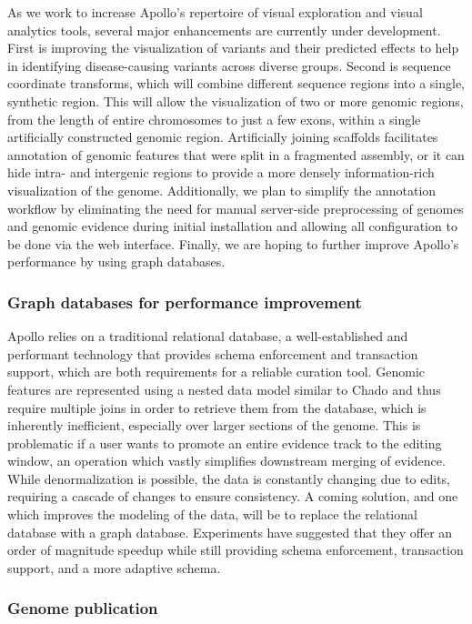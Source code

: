 As we work to increase Apollo's repertoire of visual exploration and
visual analytics tools, several major enhancements are currently under
development. First is improving the visualization of variants and their
predicted effects to help in identifying disease-causing variants across
diverse groups. Second is sequence coordinate transforms, which will
combine different sequence regions into a single, synthetic region. This
will allow the visualization of two or more genomic regions, from the
length of entire chromosomes to just a few exons, within a single
artificially constructed genomic region. Artificially joining scaffolds
facilitates annotation of genomic features that were split in a
fragmented assembly, or it can hide intra- and intergenic regions to
provide a more densely information-rich visualization of the genome.
Additionally, we plan to simplify the annotation workflow by eliminating
the need for manual server-side preprocessing of genomes and genomic
evidence during initial installation and allowing all configuration to
be done via the web interface. Finally, we are hoping to further improve
Apollo's performance by using graph databases.

\subsubsection*{Graph databases for performance
improvement}

Apollo relies on a traditional relational database, a well-established
and performant technology that provides schema enforcement and
transaction support, which are both requirements for a reliable curation
tool. Genomic features are represented using a nested data model similar
to Chado \cite{Mungall_2007} and thus require multiple joins in order to retrieve
them from the database, which is inherently inefficient, especially over
larger sections of the genome. This is problematic if a user wants to
promote an entire evidence track to the editing window, an operation
which vastly simplifies downstream merging of evidence. While
denormalization is possible, the data is constantly changing due to
edits, requiring a cascade of changes to ensure consistency. A coming
solution, and one which improves the modeling of the data, will be to
replace the relational database with a graph database. Experiments have
suggested that they offer an order of magnitude speedup while still
providing schema enforcement, transaction support, and a more adaptive
schema.

\subsubsection*{Genome publication}

